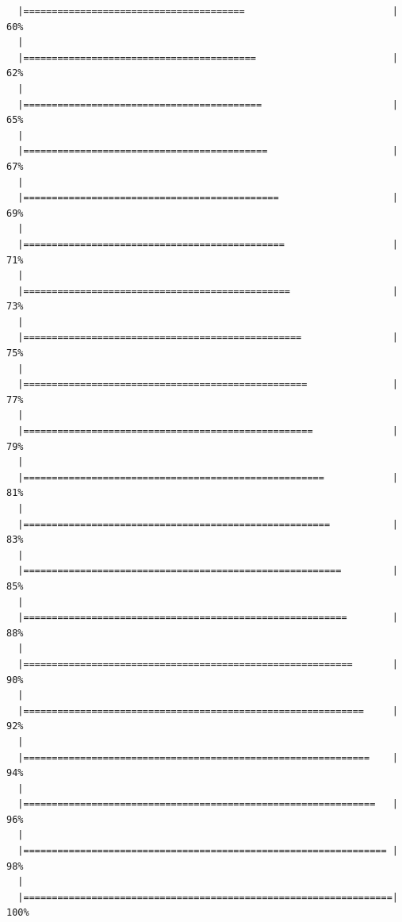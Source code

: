 \documentclass[]{book}
\begin{document}
\begin{verbatim}
  |=======================================                          |  60%
  |                                                                       
  |=========================================                        |  62%
  |                                                                       
  |==========================================                       |  65%
  |                                                                       
  |===========================================                      |  67%
  |                                                                       
  |=============================================                    |  69%
  |                                                                       
  |==============================================                   |  71%
  |                                                                       
  |===============================================                  |  73%
  |                                                                       
  |=================================================                |  75%
  |                                                                       
  |==================================================               |  77%
  |                                                                       
  |===================================================              |  79%
  |                                                                       
  |=====================================================            |  81%
  |                                                                       
  |======================================================           |  83%
  |                                                                       
  |========================================================         |  85%
  |                                                                       
  |=========================================================        |  88%
  |                                                                       
  |==========================================================       |  90%
  |                                                                       
  |============================================================     |  92%
  |                                                                       
  |=============================================================    |  94%
  |                                                                       
  |==============================================================   |  96%
  |                                                                       
  |================================================================ |  98%
  |                                                                       
  |=================================================================| 100%
\end{verbatim}
\end{document}
